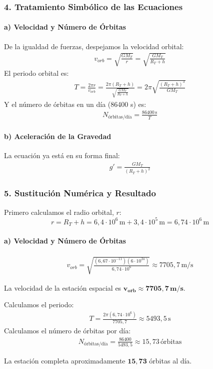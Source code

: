 \subsubsection*{4. Tratamiento Simbólico de las Ecuaciones}
\paragraph*{a) Velocidad y Número de Órbitas}
De la igualdad de fuerzas, despejamos la velocidad orbital:
\begin{gather}
    v_{orb} = \sqrt{\frac{G M_T}{r}} = \sqrt{\frac{G M_T}{R_T+h}}
\end{gather}
El periodo orbital es:
\begin{gather}
    T = \frac{2\pi r}{v_{orb}} = \frac{2\pi(R_T+h)}{\sqrt{\frac{G M_T}{R_T+h}}} = 2\pi\sqrt{\frac{(R_T+h)^3}{G M_T}}
\end{gather}
Y el número de órbitas en un día (86400 s) es:
\begin{gather}
    N_{\text{órbitas/día}} = \frac{86400\,\text{s}}{T}
\end{gather}

\paragraph*{b) Aceleración de la Gravedad}
La ecuación ya está en su forma final:
\begin{gather}
    g' = \frac{G M_T}{(R_T+h)^2}
\end{gather}

\subsubsection*{5. Sustitución Numérica y Resultado}
Primero calculamos el radio orbital, $r$:
$$ r = R_T+h = 6,4 \cdot 10^6\,\text{m} + 3,4 \cdot 10^5\,\text{m} = 6,74 \cdot 10^6\,\text{m} $$

\paragraph*{a) Velocidad y Número de Órbitas}
\begin{gather}
    v_{orb} = \sqrt{\frac{(6,67\cdot10^{-11})(6\cdot10^{24})}{6,74 \cdot 10^6}} \approx 7705,7\,\text{m/s}
\end{gather}
\begin{cajaresultado}
    La velocidad de la estación espacial es $\boldsymbol{v_{orb} \approx 7705,7\,\textbf{m/s}}$.
\end{cajaresultado}
Calculamos el periodo:
\begin{gather}
    T = \frac{2\pi (6,74 \cdot 10^6)}{7705,7} \approx 5493,5\,\text{s}
\end{gather}
Calculamos el número de órbitas por día:
\begin{gather}
    N_{\text{órbitas/día}} = \frac{86400}{5493,5} \approx 15,73\,\text{órbitas}
\end{gather}
\begin{cajaresultado}
    La estación completa aproximadamente $\boldsymbol{15,73}$ órbitas al día.
\end{cajaresultado}

